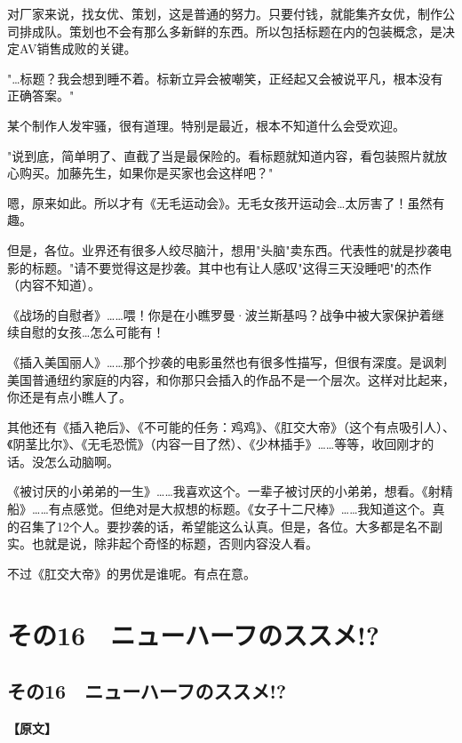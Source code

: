 \documentclass[12pt,UTF8]{ctexbook}
\begin{document}
{{对厂家来说，找女优、策划，这是普通的努力。只要付钱，就能集齐女优，制作公司排成队。策划也不会有那么多新鲜的东西。所以包括标题在内的包装概念，是决定AV销售成败的关键。

"…标题？我会想到睡不着。标新立异会被嘲笑，正经起又会被说平凡，根本没有正确答案。"

某个制作人发牢骚，很有道理。特别是最近，根本不知道什么会受欢迎。

"说到底，简单明了、直截了当是最保险的。看标题就知道内容，看包装照片就放心购买。加藤先生，如果你是买家也会这样吧？"

嗯，原来如此。所以才有《无毛运动会》。无毛女孩开运动会…太厉害了！虽然有趣。

但是，各位。业界还有很多人绞尽脑汁，想用"头脑"卖东西。代表性的就是抄袭电影的标题。"请不要觉得这是抄袭。其中也有让人感叹"这得三天没睡吧"的杰作（内容不知道）。

《战场的自慰者》……喂！你是在小瞧罗曼·波兰斯基吗？战争中被大家保护着继续自慰的女孩…怎么可能有！

《插入美国丽人》……那个抄袭的电影虽然也有很多性描写，但很有深度。是讽刺美国普通纽约家庭的内容，和你那只会插入的作品不是一个层次。这样对比起来，你还是有点小瞧人了。

其他还有《插入艳后》、《不可能的任务：鸡鸡》、《肛交大帝》（这个有点吸引人）、《阴茎比尔》、《无毛恐慌》（内容一目了然）、《少林插手》……等等，收回刚才的话。没怎么动脑啊。

《被讨厌的小弟弟的一生》……我喜欢这个。一辈子被讨厌的小弟弟，想看。《射精船》……有点感觉。但绝对是大叔想的标题。《女子十二尺棒》……我知道这个。真的召集了12个人。要抄袭的话，希望能这么认真。但是，各位。大多都是名不副实。也就是说，除非起个奇怪的标题，否则内容没人看。

不过《肛交大帝》的男优是谁呢。有点在意。
}

\chapter{その16　ニューハーフのススメ!?}
\label{chap:16}

\section{その16　ニューハーフのススメ!?}

\vspace{1ex}
\parbox{0.9\linewidth}{
\textbf{【原文】}\par

}}
\end{document}
